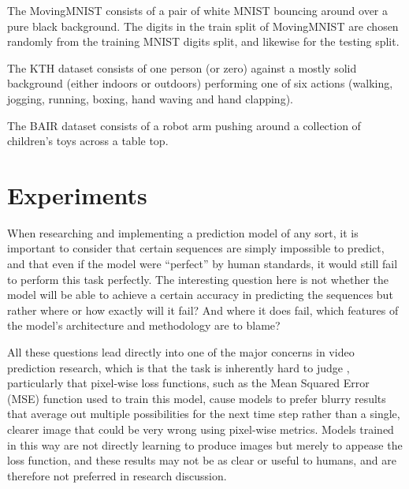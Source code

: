 \documentclass{scrartcl}
\begin{document}
The MovingMNIST consists of a pair of white MNIST \cite{mnist_digits} bouncing
around over a pure black background. The digits in the train split of
MovingMNIST are chosen randomly from the training MNIST digits split, and
likewise for the testing split.

The KTH dataset consists of one person (or zero) against a mostly solid
background (either indoors or outdoors) performing one of six actions (walking,
jogging, running, boxing, hand waving and hand clapping).

The BAIR dataset consists of a robot arm pushing around a collection of
children's toys across a table top. 

\newpage
\section{Experiments}
\label{sec:experiments}


When researching and implementing a prediction model of any sort, it is
important to consider that certain sequences are simply impossible to predict,
and that even if the model were ``perfect'' by human standards, it would still
fail to perform this task perfectly. The interesting question here is not
whether the model will be able to achieve a certain accuracy in predicting the
sequences but rather where or how exactly will it fail? And where it does fail,
which features of the model's architecture and methodology are to blame?

All these questions lead directly into one of the major concerns in video
prediction research, which is that the task is inherently hard to judge
\cite{video_prediction_survey}, particularly that pixel-wise loss functions,
such as the Mean Squared Error (MSE) function used to train this model, cause
models to prefer blurry results that average out multiple possibilities for the
next time step rather than a single, clearer image that could be very wrong
using pixel-wise metrics. Models trained in this way are not directly learning
to produce images but merely to appease the loss function, and these results
may not be as clear or useful to humans, and are therefore not preferred in
research discussion.
\end{document}
